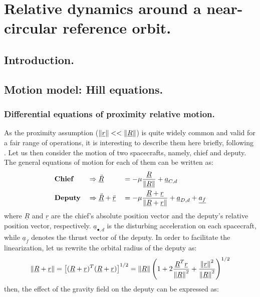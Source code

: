 \chapter{Relative dynamics around a near-circular reference orbit.}
%
\label{chap: HCW}
%
\section{Introduction.}
%
%
\section{Motion model: Hill equations.}
%
\indent
%
	\subsection{Differential equations of proximity relative motion.} \label{sec: Diff_eqs_prox}
	\indent As the proximity assumption ($\mbox{$\left\lVert \underline{r} \right\rVert$} <<\mbox{$\left\lVert \underline{R} \right\rVert$}$) is quite widely common and valid for a fair range of operations, it is interesting to describe them here briefly, following \cite{Yamanaka_ankersen}. Let us then consider the motion of two spacecrafts, namely, chief and deputy. The general equations of motion for each of them can be written as:
	\begin{alignat}{3}
	&\textbf{Chief} 		&& \Rightarrow   \underline{\ddot{R}}   && = - \mu \dfrac{\underline{R}}{\mbox{$\left\lVert \underline{R} \right\rVert$}} + \underline{a}_{C, d} \label{eqCh2:	chief_eq} \\
	&\textbf{Deputy} 		&& \Rightarrow   \underline{\ddot{R}} + \underline{\ddot{r}}  && =  - \mu \dfrac{\underline{R} + \underline{r}}{\mbox{$\left\lVert \underline{R} + \underline{r} \right\rVert$}} + \underline{a}_{D, d} + \underline{a_f}  \label{eqCh2:deputy_eq}
	\end{alignat}
	\noindent where $\underline{R}$ and $\underline{r}$ are the chief's absolute position vector and the deputy's relative position vector, respectively. $\underline{a}_{\bullet, d}$ is the disturbing acceleration on each spacecraft, while $\underline{a}_f$ denotes the thrust vector of the deputy. In order to facilitate the linearization, let us rewrite the orbital radius of the deputy as:
	\[
	\mbox{$\left\lVert \underline{R} + \underline{r} \right\rVert$} = \left[ (\underline{R} + \underline{r})^T (\underline{R} + \underline{r}) \right]^{1/2} = \mbox{$\left\lVert \underline{R} \right\rVert$} \left( 1 + 2 \dfrac{\underline{R}^T \underline{r}}{\mbox{$\left\lVert \underline{R} \right\rVert$}^2} + \dfrac{\mbox{$\left\lVert \underline{r} \right\rVert$}^2}{\mbox{$\left\lVert \underline{R} \right\rVert$}^2} \right)^{1/2}
	\]
	\noindent then, the effect of the gravity field on the deputy can be expressed as:
